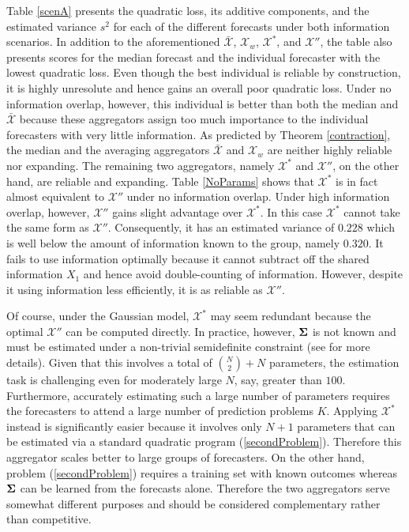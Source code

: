 \documentclass[11pt]{article}
\theoremstyle{definition}
\theoremstyle{definition}
\def\bSigma{{\bf \Sigma}}
\begin{document}
Table \ref{scenA} presents the quadratic loss, its additive components, and the estimated variance $s^2$ for each of the different forecasts under both information scenarios. In addition to the aforementioned $\bar{\mathcal{X}}$, $\mathcal{X}_w$, $\mathcal{X}^*$, and $\mathcal{X}''$, the table also presents scores for the median forecast and the individual forecaster with the lowest quadratic loss. Even though the best individual is reliable by construction, it is highly unresolute and hence gains an overall poor quadratic loss. 
%
 Under no information overlap, however, this individual is better than both the median and $\bar{\mathcal{X}}$ because these aggregators assign too much importance to the individual forecasters with very little information.  As predicted by Theorem \ref{contraction},  the median and the averaging aggregators $\bar{\mathcal{X}}$ and $\mathcal{X}_w$ are neither highly reliable nor expanding. The remaining two aggregators, namely $\mathcal{X}^*$ and $\mathcal{X}''$, on the other hand, are reliable and expanding. Table \ref{NoParams} shows that $\mathcal{X}^*$ is in fact  almost equivalent to $\mathcal{X}''$ under no information overlap. Under high information overlap, however, $\mathcal{X}''$ gains slight advantage over $\mathcal{X}^*$. In this case $\mathcal{X}^*$ cannot take the same form as $\mathcal{X}''$. Consequently, it has an estimated variance of $0.228$ which is well below the  amount of information known to the group, namely $0.320$. It fails to use information optimally because it cannot subtract off the shared information $X_1$ and hence avoid double-counting of information. However, despite it using information less efficiently, it is as reliable as $\mathcal{X}''$. 

Of course, under the Gaussian model, $\mathcal{X}^*$ may seem redundant because the optimal  $\mathcal{X}''$ can be computed directly. In practice, however, $\bSigma$ is not known and must be estimated under a non-trivial semidefinite constraint (see \citealt{satopaamodeling2} for more details). Given that this involves a total of $\binom{N}{2} + N$ parameters, the estimation task is challenging even for moderately large $N$, say, greater than $100$. Furthermore, accurately estimating such a large number of parameters requires the forecasters to attend a large number of prediction problems $K$. Applying $\mathcal{X}^*$ instead is significantly easier because it involves only $N+1$ parameters that can be estimated via a standard quadratic program (\ref{secondProblem}).  Therefore this aggregator scales better to large groups of forecasters. On the other hand, problem (\ref{secondProblem}) requires a training set with known outcomes whereas $\bSigma$ can be learned from the forecasts alone. Therefore the two aggregators serve somewhat different purposes and should be considered complementary rather than competitive.
\end{document}
